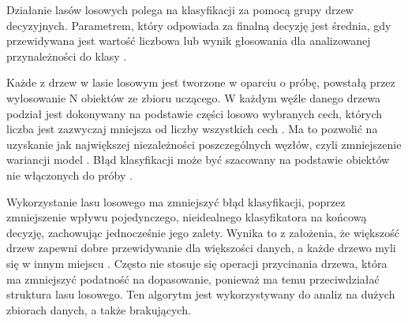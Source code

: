 Działanie lasów losowych polega na klasyfikacji za pomocą grupy drzew decyzyjnych. Parametrem, który odpowiada za finalną decyzję jest średnia, gdy przewidywana jest wartość liczbowa lub wynik głosowania dla analizowanej przynależności do klasy \cite{BiauGerard2016Arfg}.

Każde z drzew w lasie losowym jest tworzone w oparciu o próbę, powstałą przez wylosowanie N obiektów ze zbioru uczącego. W każdym węźle danego drzewa podział jest dokonywany na podstawie części losowo wybranych cech, których liczba jest zazwyczaj mniejsza od liczby wszystkich cech \cite{SuthaharanShan2015MLMa}. Ma to pozwolić na uzyskanie jak największej niezależności poszczególnych węzłów, czyli zmniejszenie wariancji model \cite{BiauGerard2016Arfg}.
Błąd klasyfikacji może być szacowany na podstawie obiektów nie włączonych do próby \cite{randomBerkeley}.

Wykorzystanie lasu losowego ma zmniejszyć błąd klasyfikacji, poprzez zmniejszenie wpływu pojedynczego, nieidealnego klasyfikatora na końcową decyzję, zachowując jednocześnie jego zalety. Wynika
to z założenia, że większość drzew zapewni dobre przewidywanie dla większości danych, a każde
drzewo myli się w innym miejscu \cite{randomTowardsData}. Często nie stosuje się operacji przycinania drzewa, która ma zmniejszyć podatność na dopasowanie, ponieważ ma temu przeciwdziałać struktura lasu losowego.  Ten algorytm jest wykorzystywany do analiz na dużych zbiorach danych,
a także brakujących.





